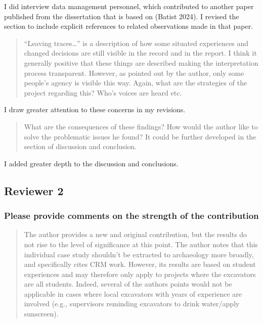 \documentclass[
]{article}
\begin{document}
I did interview data management personnel, which contributed to another
paper published from the dissertation that is based on (Batist 2024). I
revised the section to include explicit references to related
observations made in that paper.

\begin{quote}
``Leaving traces\ldots{}'' is a description of how some situated
experiences and changed decisions are still visible in the record and in
the report. I think it generally positive that these things are
described making the interpretation process transparent. However, as
pointed out by the author, only some people's agency is visible this
way. Again, what are the strategies of the project regarding this? Who's
voices are heard etc.
\end{quote}

I draw greater attention to these concerns in my revisions.

\begin{quote}
What are the consequences of these findings? How would the author like
to solve the problematic issues he found? It could be further developed
in the section of discussion and conclusion.
\end{quote}

I added greater depth to the discussion and conclusions.

\subsection{Reviewer 2}\label{reviewer-2}

\subsubsection{Please provide comments on the strength of the
contribution}\label{please-provide-comments-on-the-strength-of-the-contribution}

\begin{quote}
The author provides a new and original contribution, but the results do
not rise to the level of significance at this point. The author notes
that this individual case study shouldn't be extracted to archaeology
more broadly, and specifically cites CRM work. However, its results are
based on student experiences and may therefore only apply to projects
where the excavators are all students. Indeed, several of the authors
points would not be applicable in cases where local excavators with
years of experience are involved (e.g., supervisors reminding excavators
to drink water/apply sunscreen).
\end{quote}
\end{document}
